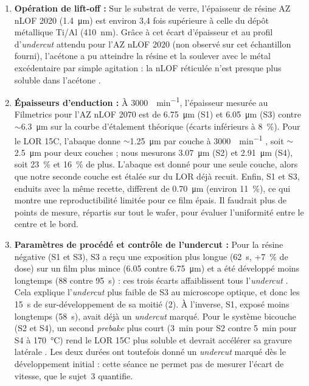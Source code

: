 \begin{enumerate}
  \item \textbf{Opération de lift-off :} Sur le substrat de verre, l'épaisseur de résine AZ nLOF 2020 (\qty{1,4}{\micro\metre}) est environ 3,4 fois supérieure à celle du dépôt métallique Ti/Al (\qty{410}{\nano\metre}). Grâce à cet écart d'épaisseur et au profil d'\emph{undercut} attendu pour l'AZ nLOF 2020 (non observé sur cet échantillon fourni), l'acétone a pu atteindre la résine et la soulever avec le métal excédentaire par simple agitation : la nLOF réticulée n'est presque plus soluble dans l'acétone \cite{tdsnlof}.
  \item \textbf{Épaisseurs d'enduction :} À \qty{3000}{\tour\per\minute}, l'épaisseur mesurée au Filmetrics pour l'AZ nLOF 2070 est de \qty{6,75}{\micro\metre} (S1) et \qty{6,05}{\micro\metre} (S3) contre $\sim$\qty{6,3}{\micro\metre} sur la courbe d'étalement théorique (écarts inférieurs à \qty{8}{\percent}). Pour le LOR 15C, l'abaque donne $\sim$\qty{1,25}{\micro\metre} par couche à \qty{3000}{\tour\per\minute} \cite{lor}, soit $\sim$\qty{2,5}{\micro\metre} pour deux couches ; nous mesurons \qty{3,07}{\micro\metre} (S2) et \qty{2,91}{\micro\metre} (S4), soit \qty{23}{\percent} et \qty{16}{\percent} de plus. L'abaque est donné pour une seule couche, alors que notre seconde couche est étalée sur du LOR déjà recuit. Enfin, S1 et S3, enduits avec la même recette, diffèrent de \qty{0,70}{\micro\metre} (environ \qty{11}{\percent}), ce qui montre une reproductibilité limitée pour ce film épais. Il faudrait plus de points de mesure, répartis sur tout le wafer, pour évaluer l'uniformité entre le centre et le bord.
  \item \textbf{Paramètres de procédé et contrôle de l'undercut :} Pour la résine négative (S1 et S3), S3 a reçu une exposition plus longue (\qty{62}{\second}, +\qty{7}{\percent} de dose) sur un film plus mince (\num{6,05} contre \qty{6,75}{\micro\metre}) et a été développé moins longtemps (\num{88} contre \qty{95}{\second}) : ces trois écarts affaiblissent tous l'\emph{undercut} \cite{mcliftoff}. Cela explique l'\emph{undercut} plus faible de S3 au microscope optique, et donc les \qty{15}{\second} de sur-développement de sa moitié (2). À l'inverse, S1, exposé moins longtemps (\qty{58}{\second}), avait déjà un \emph{undercut} marqué. Pour le système bicouche (S2 et S4), un second \emph{prebake} plus court (\qty{3}{\minute} pour S2 contre \qty{5}{\minute} pour S4 à \qty{170}{\celsius}) rend le LOR 15C plus soluble et devrait accélérer sa gravure latérale \cite{lor}. Les deux durées ont toutefois donné un \emph{undercut} marqué dès le développement initial : cette séance ne permet pas de mesurer l'écart de vitesse, que le sujet~3 quantifie.
\end{enumerate}

